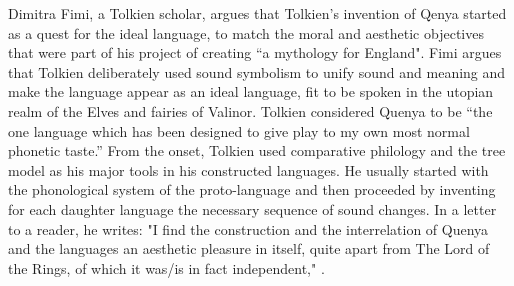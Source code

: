 \documentclass[pub]{apa6}
\begin{document}
\indent Dimitra Fimi, a Tolkien scholar, argues that Tolkien's invention of Qenya started as a quest for the ideal language, to match the moral and aesthetic objectives that were part of his project of creating ``a mythology for England". Fimi argues that Tolkien deliberately used sound symbolism to unify sound and meaning and make the language appear as an ideal language, fit to be spoken in the utopian realm of the Elves and fairies of Valinor. Tolkien considered Quenya to be ``the one language which has been designed to give play to my own most normal phonetic taste.'' From the onset, Tolkien used comparative philology and the tree model as his major tools in his constructed languages. He usually started with the phonological system of the proto-language and then proceeded by inventing for each daughter language the necessary sequence of sound changes. In a letter to a reader, he writes: "I find the construction and the interrelation of Quenya and the languages an aesthetic pleasure in itself, quite apart from The Lord of the Rings, of which it was/is in fact independent," \cite{tolkien1964b}.
\end{document}
